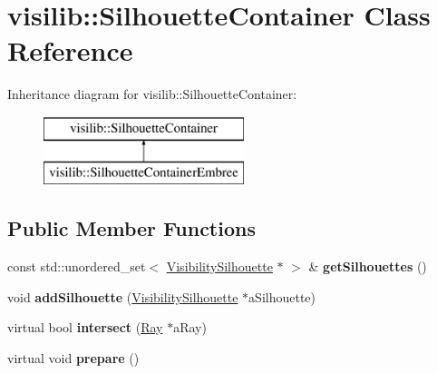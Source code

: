 \hypertarget{classvisilib_1_1_silhouette_container}{}\section{visilib\+::Silhouette\+Container Class Reference}
\label{classvisilib_1_1_silhouette_container}
Inheritance diagram for visilib\+::Silhouette\+Container\+:\begin{figure}[H]
\begin{center}
\leavevmode
\includegraphics[height=2.000000cm]{classvisilib_1_1_silhouette_container}
\end{center}
\end{figure}
\subsection*{Public Member Functions}
\begin{DoxyCompactItemize}
\item 
\mbox{\label{classvisilib_1_1_silhouette_container_a38471133888f49fbed4035f8da75f23b}} 
const std\+::unordered\+\_\+set$<$ \mbox{\hyperlink{classvisilib_1_1_visibility_silhouette}{Visibility\+Silhouette}} $\ast$ $>$ \& {\bfseries get\+Silhouettes} ()
\item 
\mbox{\label{classvisilib_1_1_silhouette_container_aef12600c0735f49a8b4c80bc5d5a2d50}} 
void {\bfseries add\+Silhouette} (\mbox{\hyperlink{classvisilib_1_1_visibility_silhouette}{Visibility\+Silhouette}} $\ast$a\+Silhouette)
\item 
\mbox{\label{classvisilib_1_1_silhouette_container_a45fe6f13c65d91a7f500bb47f3a6cb34}} 
virtual bool {\bfseries intersect} (\mbox{\hyperlink{structvisilib_1_1_ray}{Ray}} $\ast$a\+Ray)
\item 
\mbox{\label{classvisilib_1_1_silhouette_container_a83c0a6a3517e09446d8f145a3f58eda7}} 
virtual void {\bfseries prepare} ()
\end{DoxyCompactItemize}
